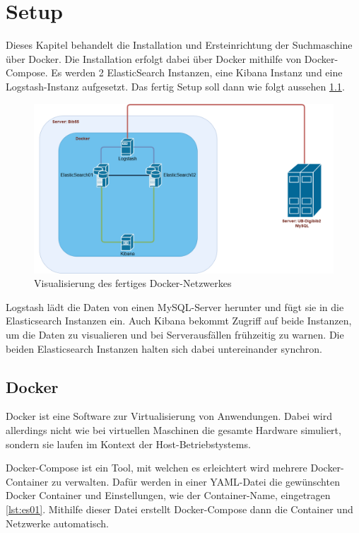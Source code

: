 \chapter{Setup}

Dieses Kapitel behandelt die Installation und Ersteinrichtung der Suchmaschine über Docker. Die Installation erfolgt dabei über Docker mithilfe von Docker-Compose. Es werden 2 ElasticSearch Instanzen, eine Kibana Instanz und eine Logstash-Instanz aufgesetzt. Das fertig Setup soll dann wie folgt aussehen \ref{img:dockerNetwork}.

\begin{figure}
	\centering
	\includegraphics[width=1\linewidth]{images/docker_structure.png}
	\caption{Visualisierung des fertiges Docker-Netzwerkes}
	\label{img:dockerNetwork}
\end{figure}

Logstash lädt die Daten von einen MySQL-Server herunter und fügt sie in die Elasticsearch Instanzen ein. Auch Kibana bekommt Zugriff auf beide Instanzen, um die Daten zu visualieren und bei Serverausfällen frühzeitig zu warnen. Die beiden Elasticsearch Instanzen halten sich dabei untereinander synchron. 

\section{Docker}

Docker ist eine Software zur Virtualisierung von Anwendungen. Dabei wird allerdings nicht wie bei virtuellen Maschinen die gesamte Hardware simuliert, sondern sie laufen im Kontext der Host-Betriebstystems.

Docker-Compose ist ein Tool, mit welchen es erleichtert wird mehrere Docker-Container zu verwalten. Dafür werden in einer YAML-Datei die gewünschten Docker Container und Einstellungen, wie der Container-Name, eingetragen \ref{lst:es01}. Mithilfe dieser Datei erstellt Docker-Compose dann die Container und Netzwerke automatisch.

